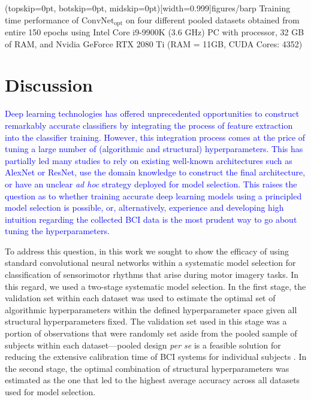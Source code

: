 \documentclass{ieeeaccess}
\begin{document}
{\Figure[t!](topskip=0pt, botskip=0pt, midskip=0pt)[width=0.999\linewidth]{figures/barp}
{Training time performance of $\text{ConvNet}_{\text{opt}}$ on four different pooled datasets obtained from entire 150 epochs using Intel Core i9-9900K (3.6 GHz) PC with processor, 32 GB of RAM, and Nvidia GeForce RTX 2080 Ti (RAM = 11GB,  CUDA Cores: 4352) \label{fig:train_time}}

   
\section{Discussion}
\label{sec:discussion}
{\textcolor{blue}{Deep learning technologies has offered unprecedented opportunities to construct remarkably accurate classifiers by integrating the process of feature extraction into the classifier training. However, this integration process comes at the price of tuning a large number of (algorithmic and structural) hyperparameters. This has partially led many studies to rely on existing well-known architectures such as AlexNet or ResNet, use the domain knowledge to construct the final architecture, or have an unclear \textit{ad hoc} strategy deployed for model selection. This raises the question as to whether training accurate deep learning models using a principled model selection is possible, or, alternatively, experience and developing high intuition regarding the collected BCI data is the most prudent way to go about tuning the hyperparameters. }
    
    To address this question, in this work we sought to show the efficacy of using standard convolutional neural networks within a systematic model selection for classification of sensorimotor rhythms that arise during motor imagery tasks. In this regard, we used a two-stage systematic model selection. In the first stage, the validation set within each dataset was used to estimate the optimal set of algorithmic hyperparameters within the defined hyperparameter space given all structural hyperparameters fixed. The validation set used in this stage was a portion of observations that were randomly set aside from the pooled sample of subjects within each dataset---pooled design \textit{per se} is a feasible solution for reducing the extensive calibration time of BCI systems for individual subjects \cite{Lotte2015}. In the second stage, the optimal combination of structural hyperparameters was estimated as the one that led to the highest average accuracy across all datasets used for model selection.} 
    
}
\end{document}
